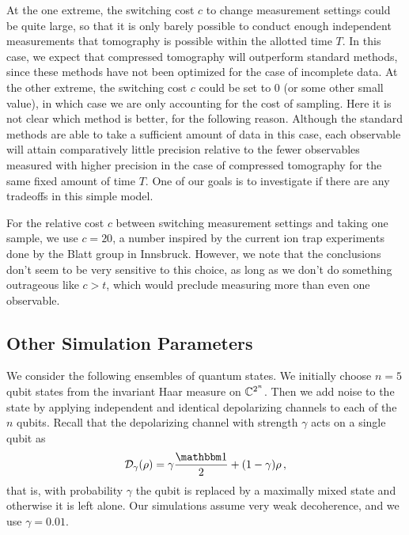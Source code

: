 At the one extreme, the switching cost $c$ to change measurement settings could be quite large, so that it is only barely possible to conduct enough independent measurements that tomography is possible within the allotted time $T$.  In this case, we expect that compressed tomography will outperform standard methods, since these methods have not been optimized for the case of incomplete data.  At the other extreme, the switching cost $c$ could be set to $0$ (or some other small value), in which case we are only accounting for the cost of sampling.  Here it is not clear which method is better, for the following reason.  Although the standard methods are able to take a sufficient amount of data in this case, each observable will attain comparatively little precision relative to the fewer observables measured with higher precision in the case of compressed tomography for the same fixed amount of time $T$. One of our goals is to investigate if there are any tradeoffs in this simple model. 

For the relative cost $c$ between switching measurement settings and taking one sample, we use $c = 20$, a number inspired by the current ion trap experiments done by the Blatt group in Innsbruck. However, we note that the conclusions don't seem to be very sensitive to this choice, as long as we don't do something outrageous like $c > t$, which would preclude measuring more than even one observable. 


\subsection{Other Simulation Parameters\label{S:params}}


We consider the following ensembles of quantum states. We initially choose $n=5$ qubit states from the invariant Haar measure on $\mathbb{C}^{2^n}$. 
Then we add noise to the state by applying independent and identical depolarizing channels to each of the $n$ qubits. Recall that the depolarizing channel with strength $\gamma$ acts on a single qubit as
\begin{align}
	\mathcal{D}_\gamma(\rho) = \gamma \frac{\one}{2} + (1-\gamma) \rho \,,
\end{align}
that is, with probability $\gamma$ the qubit is replaced by a maximally mixed state and otherwise it is left alone. Our simulations assume very weak decoherence, and we use $\gamma = 0.01$.

